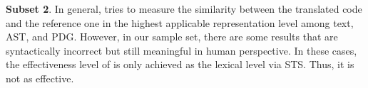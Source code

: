 \textbf{Subset 2}. In general, {\model} tries to measure the
similarity between the translated code and the reference one in the
highest applicable representation level among text, AST, and
PDG. However, in our sample set, there are some results that are
syntactically incorrect but still meaningful in human perspective. In
these cases, the effectiveness level of {\model} is only achieved as
the lexical level via STS. Thus, it is not as effective.



